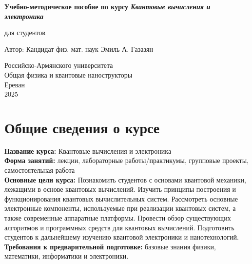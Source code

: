 \documentclass[a4paper,12pt]{article}
\begin{document}
\begin{titlepage}
	\centering
	\vspace*{1cm}

	{\Huge \textbf{Учебно-методическое пособие по курсу
			\textit{Квантовые вычисления и электроника}}}

	\vspace{0.5cm}
	{\Large для студентов}

	\vspace{1.5cm}

	{\Large Автор: Кандидат физ. мат. наук Эмиль  А. Газазян}

	\vfill

	\vspace{0.8cm}

	{\Large Российско-Армянского университета \\
		Общая физика и квантовые нанострукторы\\
		Ереван\\
		2025}

\end{titlepage}

\tableofcontents
\newpage

\section{Общие сведения о курсе}
\textbf{Название курса:} Квантовые вычисления и электроника\\
\textbf{Форма занятий:} лекции, лабораторные работы/практикумы, групповые проекты, самостоятельная работа\\
\textbf{Основные цели курса:}
Познакомить студентов с основами квантовой механики, лежащими в основе квантовых вычислений.
Изучить принципы построения и функционирования квантовых вычислительных систем.
Рассмотреть основные электронные компоненты, используемые при реализации квантовых систем, а также современные аппаратные платформы.
Провести обзор существующих алгоритмов и программных средств для квантовых вычислений.
Подготовить студентов к дальнейшему изучению квантовой электроники и нанотехнологий.    \\
\textbf{Требования к предварительной подготовке:} базовые знания физики, математики, информатики и электроники.\\
\end{document}
